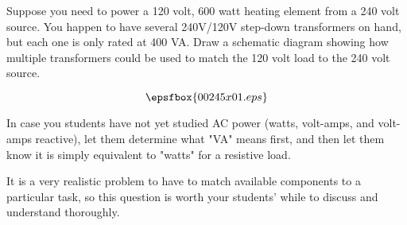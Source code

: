 

Suppose you need to power a 120 volt, 600 watt heating element from a 240 volt source.  You happen to have several 240V/120V step-down transformers on hand, but each one is only rated at 400 VA.  Draw a schematic diagram showing how multiple transformers could be used to match the 120 volt load to the 240 volt source.







$$\epsfbox{00245x01.eps}$$







In case you students have not yet studied AC power (watts, volt-amps, and volt-amps reactive), let them determine what "VA" means first, and then let them know it is simply equivalent to "watts" for a resistive load.

It is a very realistic problem to have to match available components to a particular task, so this question is worth your students' while to discuss and understand thoroughly.




